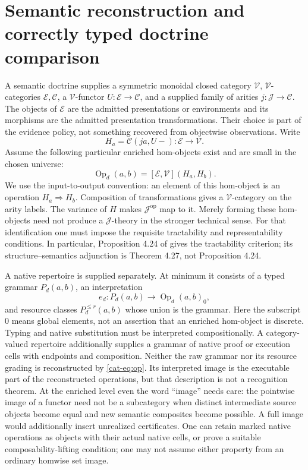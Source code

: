 \documentclass[11pt]{article}
\theoremstyle{definition}
\theoremstyle{remark}
\newcommand{\V}{\mathcal V}
\newcommand{\E}{\mathcal E}
\newcommand{\C}{\mathcal C}
\newcommand{\Op}{\operatorname{Op}}
\begin{document}
\section{Semantic reconstruction and correctly typed doctrine comparison}
\label{sec:framework}
A semantic doctrine supplies a symmetric monoidal closed category $\V$,
$\V$-categories $\E,\C$, a $\V$-functor $U:\E\to\C$, and a supplied
family of arities $j:\mathcal J\to\C$. The objects of $\E$ are the
admitted presentations or environments and its morphisms are the admitted
presentation transformations. Their choice is part of the evidence policy,
not something recovered from objectwise observations. Write
\[
 H_a=\C(ja,U-):\E\longrightarrow\V.
\]
Assume the following particular enriched hom-objects exist and are small
in the chosen universe:
\begin{equation}\label{cat-eq:op}
 \Op_d(a,b)=[\E,\V](H_a,H_b).
\end{equation}
We use the input-to-output convention: an element of this hom-object is
an operation $H_a\Rightarrow H_b$. Composition of transformations gives
a $\V$-category on the arity labels. The variance of $H$ makes
$\mathcal J^{\mathrm{op}}$ map to it. Merely forming these hom-objects
need not produce a $\mathcal J$-theory in the stronger technical sense.
For that identification one must impose the requisite tractability and
representability conditions. In particular, Proposition 4.24 of
\cite{LWP} gives the tractability criterion; its structure--semantics
adjunction is Theorem 4.27, not Proposition 4.24.

A native repertoire is supplied separately. At minimum it consists of a
typed grammar $P_d(a,b)$, an interpretation
\[
 e_d:P_d(a,b)\longrightarrow\Op_d(a,b)_0,
\]
and resource classes $P_d^{\le r}(a,b)$ whose union is the grammar.
Here the subscript $0$ means global elements, not an assertion that an
enriched hom-object is discrete. Typing and native substitution must be
interpreted compositionally. A category-valued repertoire additionally
supplies a grammar of native proof or execution cells with endpoints and
composition. Neither the raw grammar nor its resource grading is
reconstructed by \eqref{cat-eq:op}. Its interpreted image is the executable
part of the reconstructed operations, but that description is not a
recognition theorem. At the enriched level even the word ``image'' needs
care: the pointwise image of a functor need not be a subcategory when
distinct intermediate source objects become equal and new semantic
composites become possible. A full image would additionally insert
unrealized certificates. One can retain marked native operations as
objects with their actual native cells, or prove a suitable
composability-lifting condition; one may not assume either property from
an ordinary homwise set image.
\end{document}
